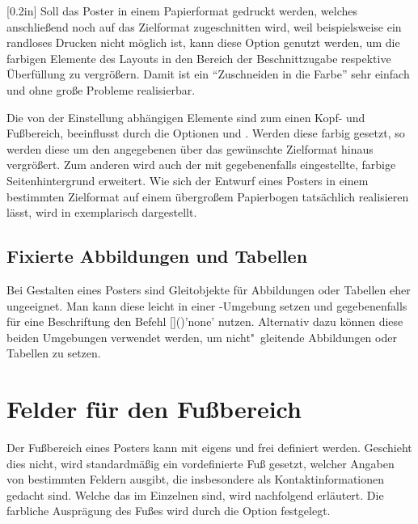 \begin{Bundle*}[v2.05]{}
\begin{Declaration}{}[0.2in]
\printdeclarationlist%
%
%
%
Soll das Poster in einem Papierformat gedruckt werden, welches anschließend 
noch auf das Zielformat zugeschnitten wird, weil beispielsweise ein randloses 
Drucken nicht möglich ist, kann diese Option genutzt werden, um die farbigen 
Elemente des Layouts in den Bereich der Beschnittzugabe respektive Überfüllung 
zu vergrößern. Damit ist ein \enquote{Zuschneiden in die Farbe} sehr einfach 
und ohne große Probleme realisierbar.

Die von der Einstellung  abhängigen 
Elemente sind zum einen Kopf- und Fußbereich, beeinflusst durch die Optionen 
 und . Werden diese farbig gesetzt, so werden 
diese um den angegebenen  über das gewünschte Zielformat 
hinaus vergrößert. Zum anderen wird auch der mit  
gegebenenfalls eingestellte, farbige Seitenhintergrund erweitert. Wie sich der 
Entwurf eines Posters in einem bestimmten Zielformat auf einem übergroßem 
Papierbogen tatsächlich realisieren lässt, wird in  
exemplarisch dargestellt.
\end{Declaration}



\subsection{Fixierte Abbildungen und Tabellen}

\begin{Declaration}[v2.06]{}
\begin{Declaration}[v2.06]{}
\printdeclarationlist%
%
Bei Gestalten eines Posters sind Gleitobjekte für Abbildungen oder Tabellen 
eher ungeeignet. Man kann diese leicht in einer -Umgebung 
setzen und gegebenenfalls für eine Beschriftung den Befehl %
[]()'none'
nutzen. Alternativ dazu können diese beiden Umgebungen verwendet werden, um 
nicht"~gleitende Abbildungen oder Tabellen zu setzen.
\end{Declaration}
\end{Declaration}



\section{Felder für den Fußbereich}
%
%
Der Fußbereich eines Posters kann mit  eigens und frei 
definiert werden. Geschieht dies nicht, wird standardmäßig ein vordefinierte 
Fuß gesetzt, welcher Angaben von bestimmten Feldern ausgibt, die insbesondere 
als Kontaktinformationen gedacht sind. Welche das im Einzelnen sind, wird 
nachfolgend erläutert. Die farbliche Ausprägung des Fußes wird durch die Option
 festgelegt.


\end{Bundle*}
